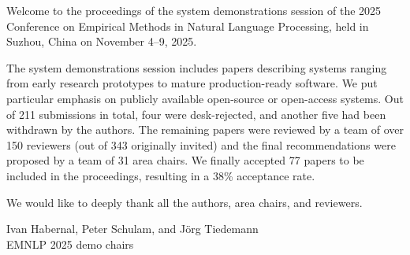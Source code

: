 Welcome to the proceedings of the system demonstrations session of the 2025 Conference on Empirical Methods in Natural Language Processing, held in Suzhou, China on November 4--9, 2025.
\bigskip

The system demonstrations session includes papers describing systems ranging from early research prototypes to mature production-ready software. We put particular emphasis on publicly available open-source or open-access systems. Out of 211 submissions in total, four were desk-rejected, and another five had been withdrawn by the authors. The remaining papers were reviewed by a team of over 150 reviewers (out of 343 originally invited) and the final recommendations were proposed by a team of 31 area chairs. We finally accepted 77 papers to be included in the proceedings, resulting in a 38\% acceptance rate.
\bigskip

We would like to deeply thank all the authors, area chairs, and reviewers.
\bigskip

Ivan Habernal, Peter Schulam, and Jörg Tiedemann \\
EMNLP 2025 demo chairs